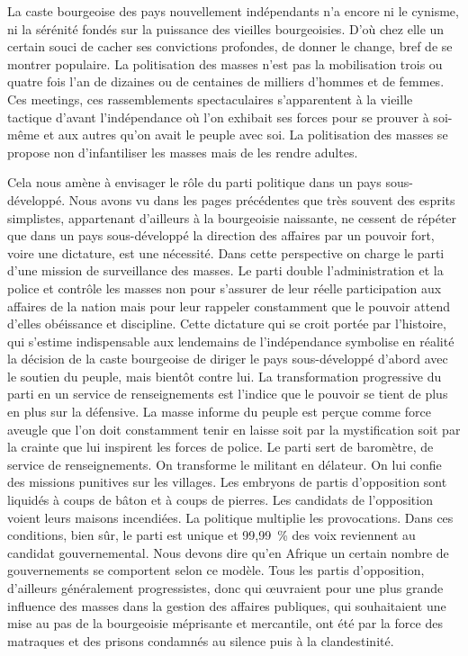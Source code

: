 \documentclass[french,twoside]{book} %
\begin{document}
\bigbreak
\noindent La caste bourgeoise des pays nouvellement indépendants n’a encore ni le cynisme, ni la sérénité fondés sur la puissance des vieilles bourgeoisies. D’où chez elle un certain souci de cacher ses convictions profondes, de donner le change, bref de se montrer populaire. La politisation des masses n’est pas la mobilisation trois ou quatre fois l’an de dizaines ou de centaines de milliers d’hommes et de femmes. Ces meetings, ces rassemblements spectaculaires s’apparentent à la vieille tactique d’avant l’indépendance où l’on exhibait ses forces pour se prouver à soi-même et aux autres qu’on avait le peuple avec soi. La politisation des masses se propose non d’infantiliser les masses mais de les rendre adultes.\par
\bigbreak
\noindent Cela nous amène à envisager le rôle du parti politique dans un pays sous-développé. Nous avons vu dans les pages précédentes que très souvent des esprits simplistes, appartenant   d’ailleurs à la bourgeoisie naissante, ne cessent de répéter que dans un pays sous-développé la direction des affaires par un pouvoir fort, voire une dictature, est une nécessité. Dans cette perspective on charge le parti d’une mission de surveillance des masses. Le parti double l’administration et la police et contrôle les masses non pour s’assurer de leur réelle participation aux affaires de la nation mais pour leur rappeler constamment que le pouvoir attend d’elles obéissance et discipline. Cette dictature qui se croit portée par l’histoire, qui s’estime indispensable aux lendemains de l’indépendance symbolise en réalité la décision de la caste bourgeoise de diriger le pays sous-développé d’abord avec le soutien du peuple, mais bientôt contre lui. La transformation progressive du parti en un service de renseignements est l’indice que le pouvoir se tient de plus en plus sur la défensive. La masse informe du peuple est perçue comme force aveugle que l’on doit constamment tenir en laisse soit par la mystification soit par la crainte que lui inspirent les forces de police. Le parti sert de baromètre, de service de renseignements. On transforme le militant en délateur. On lui confie des missions punitives sur les villages. Les embryons de partis d’opposition sont liquidés à coups de bâton et à coups de pierres. Les candidats de l’opposition voient leurs maisons incendiées. La politique multiplie les provocations. Dans ces conditions, bien sûr, le parti est unique et 99,99 \% des voix reviennent au candidat gouvernemental. Nous devons dire qu’en Afrique un certain nombre de gouvernements se comportent selon ce modèle. Tous les partis d’opposition, d’ailleurs généralement progressistes, donc qui œuvraient pour une plus grande influence des masses dans la gestion des affaires publiques, qui souhaitaient une mise au pas de la bourgeoisie méprisante et mercantile, ont été par la force des matraques et des prisons condamnés au silence puis à la clandestinité.\par
\end{document}
